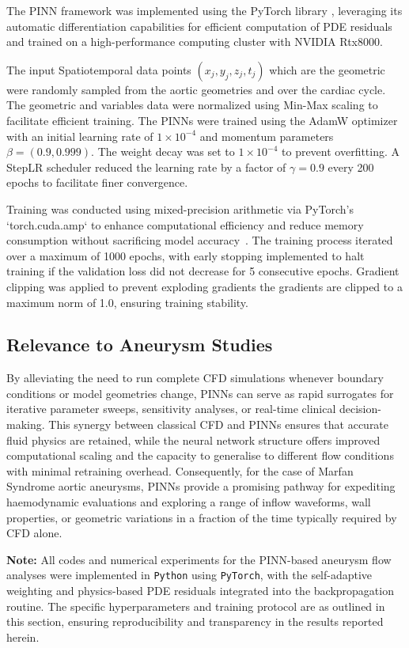 \documentclass[12pt, a4paper]{article}
\begin{document}
The PINN framework was implemented using the PyTorch library \citep{paszke2019pytorch}, leveraging its automatic differentiation capabilities for efficient computation of PDE residuals and trained on a high-performance computing cluster with NVIDIA Rtx8000. 

The input Spatiotemporal data points $(x_j, y_j, z_j, t_j)$ which are the geometric were randomly sampled from the aortic geometries and over the cardiac cycle. The geometric and variables data  were normalized using Min-Max scaling to facilitate efficient training. The PINNs were trained using the AdamW optimizer \citep{loshchilov2017decoupled} with an initial learning rate of $1 \times 10^{-4}$ and momentum parameters $\beta = (0.9, 0.999)$. The weight decay was set to $1 \times 10^{-4}$ to prevent overfitting. A StepLR scheduler reduced the learning rate by a factor of $\gamma = 0.9$ every 200 epochs to facilitate finer convergence.

Training was conducted using mixed-precision arithmetic via PyTorch's `torch.cuda.amp` to enhance computational efficiency and reduce memory consumption without sacrificing model accuracy~\cite{micikevicius2017mixed}. The training process iterated over a maximum of 1000 epochs, with early stopping implemented to halt training if the validation loss did not decrease for 5 consecutive epochs. Gradient clipping was applied to prevent exploding gradients the gradients are clipped to a maximum norm of 1.0, ensuring training stability.

\subsection{Relevance to Aneurysm Studies}
By alleviating the need to run complete CFD simulations whenever boundary conditions or model geometries change, PINNs can serve as rapid surrogates for iterative parameter sweeps, sensitivity analyses, or real-time clinical decision-making. This synergy between classical CFD and PINNs ensures that accurate fluid physics are retained, while the neural network structure offers improved computational scaling and the capacity to generalise to different flow conditions with minimal retraining overhead. Consequently, for the case of Marfan Syndrome aortic aneurysms, PINNs provide a promising pathway for expediting haemodynamic evaluations and exploring a range of inflow waveforms, wall properties, or geometric variations in a fraction of the time typically required by CFD alone.


\vspace{2em}
\noindent\textbf{Note:} All codes and numerical experiments for the PINN-based aneurysm flow analyses were implemented in \texttt{Python} using \texttt{PyTorch}, with the self-adaptive weighting and physics-based PDE residuals integrated into the backpropagation routine. The specific hyperparameters and training protocol are as outlined in this section, ensuring reproducibility and transparency in the results reported herein.
\end{document}
